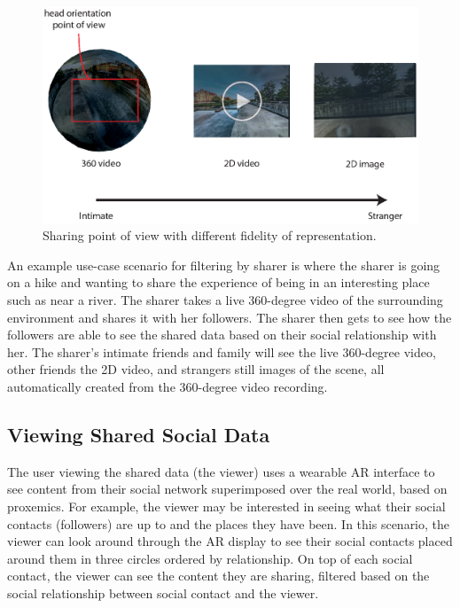 \begin{figure}[ht]
    \centering
    \includegraphics[width=.8\linewidth]{images/52-data-chi/images2_0-09.eps}
    \caption{Sharing point of view with different fidelity of representation.}
    \label{fig:data:sharer}
\end{figure}

An example use-case scenario for filtering by sharer is where the sharer is going on a hike and wanting to share the experience of being in an interesting place such as near a river. The sharer takes a live 360-degree video of the surrounding environment and shares it with her followers. The sharer then gets to see how the followers are able to see the shared data based on their social relationship with her. The sharer's intimate friends and family will see the live 360-degree video, other friends the 2D video, and strangers still images of the scene, all automatically created from the 360-degree video recording.

\subsection{Viewing Shared Social Data}

The user viewing the shared data (the viewer) uses a wearable AR interface to see content from their social network superimposed over the real world, based on proxemics. For example, the viewer may be interested in seeing what their social contacts (followers) are up to and the places they have been. In this scenario, the viewer can look around through the AR display to see their social contacts placed around them in three circles ordered by relationship. On top of each social contact, the viewer can see the content they are sharing, filtered based on the social relationship between social contact and the viewer.

